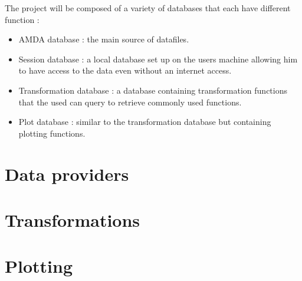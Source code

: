 \documentclass[a4paper,11pt]{report}
\begin{document}
The project will be composed of a variety of databases that each have different function : 
\begin{itemize}
\item AMDA database : the main source of datafiles.
\item Session database : a local database set up on the users machine allowing him to have access to
the data even without an internet access.
\item Transformation database : a database containing transformation functions that the used can query 
to retrieve commonly used functions.
\item Plot database : similar to the transformation database but containing plotting functions.
\end{itemize}

\section{Data providers}

\section{Transformations}

\section{Plotting}
\end{document}
